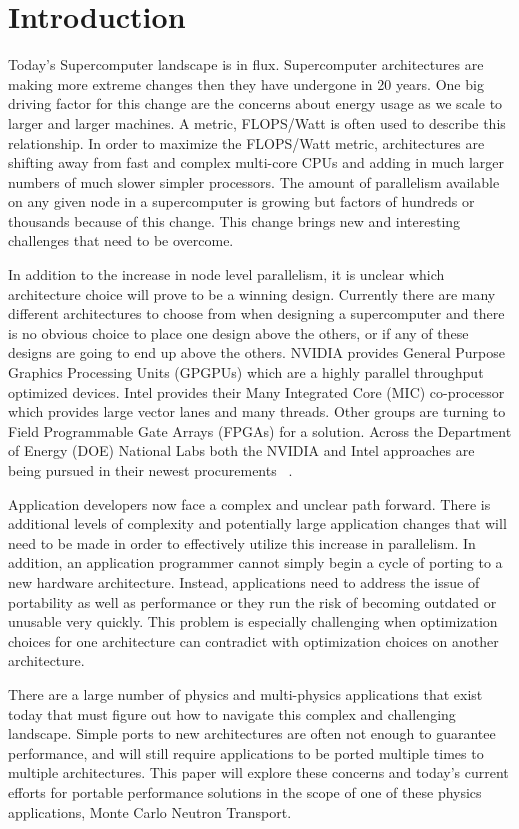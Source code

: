 \section{ \textbf{Introduction}}

Today's Supercomputer landscape is in flux.
%
Supercomputer architectures are making more extreme changes then they have undergone in 20 years.
%
One big driving factor for this change are the concerns about energy usage as we scale to larger and larger machines.
%
A metric, FLOPS/Watt is often used to describe this relationship.
%
In order to maximize the FLOPS/Watt metric, architectures are shifting away from fast and complex multi-core CPUs and adding in much larger numbers of much slower simpler processors.
%
The amount of parallelism available on any given node in a supercomputer is growing but factors of hundreds or thousands because of this change.
%
This change brings new and interesting challenges that need to be overcome.
%

%
In addition to the increase in node level parallelism, it is unclear which architecture choice will prove to be a winning design.
%
Currently there are many different architectures to choose from when designing a supercomputer and there is no obvious choice to place one design above the others, or if any of these designs are going to end up above the others.
%
NVIDIA provides General Purpose Graphics Processing Units (GPGPUs) which are a highly parallel throughput optimized devices.
%
Intel provides their Many Integrated Core (MIC) co-processor which provides large vector lanes and many threads.
%
Other groups are turning to Field Programmable Gate Arrays (FPGAs) for a solution.
%
Across the Department of Energy (DOE) National Labs both the NVIDIA and Intel approaches are being pursued in their newest procurements ~\cite{coralWeb, trinityWeb}.
%

Application developers now face a complex and unclear path forward.
%
There is additional levels of complexity and potentially large application changes that will need to be made in order to effectively utilize this increase in parallelism.
%
In addition, an application programmer cannot simply begin a cycle of porting to a new hardware architecture.
%
Instead, applications need to address the issue of portability as well as performance or they run the risk of becoming outdated or unusable very quickly.
%
This problem is especially challenging when optimization choices for one architecture can contradict with optimization choices on another architecture.
%

%
There are a large number of physics and multi-physics applications that exist today that must figure out how to navigate this complex and challenging landscape.
%
Simple ports to new architectures are often not enough to guarantee performance, and will still require applications to be ported multiple times to multiple architectures.
%
This paper will explore these concerns and today's current efforts for portable performance solutions in the scope of one of these physics applications, Monte Carlo Neutron Transport.
%


